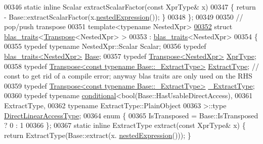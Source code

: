 \begin{DoxyCode}
00346   \textcolor{keyword}{static} \textcolor{keyword}{inline} Scalar extractScalarFactor(\textcolor{keyword}{const} XprType& x)
00347   \{ \textcolor{keywordflow}{return} - Base::extractScalarFactor(x.\hyperlink{group___core___module_a25d4402be360cf0b8ff867863da46c7d}{nestedExpression}()); \}
00348 \};
00349 
00350 \textcolor{comment}{// pop/push transpose}
00351 \textcolor{keyword}{template}<\textcolor{keyword}{typename} NestedXpr>
\hyperlink{struct_eigen_1_1internal_1_1blas__traits_3_01_transpose_3_01_nested_xpr_01_4_01_4}{00352} \textcolor{keyword}{struct }\hyperlink{struct_eigen_1_1internal_1_1blas__traits}{blas\_traits}<\hyperlink{group___core___module_class_eigen_1_1_transpose}{Transpose}<NestedXpr> >
00353  : \hyperlink{struct_eigen_1_1internal_1_1blas__traits}{blas\_traits}<NestedXpr>
00354 \{
00355   \textcolor{keyword}{typedef} \textcolor{keyword}{typename} NestedXpr::Scalar Scalar;
00356   \textcolor{keyword}{typedef} \hyperlink{struct_eigen_1_1internal_1_1blas__traits}{blas\_traits<NestedXpr>} \hyperlink{struct_eigen_1_1internal_1_1blas__traits}{Base};
00357   \textcolor{keyword}{typedef} \hyperlink{group___core___module_class_eigen_1_1_transpose}{Transpose<NestedXpr>} \hyperlink{group___core___module_class_eigen_1_1_transpose}{XprType};
00358   \textcolor{keyword}{typedef} \hyperlink{group___core___module_class_eigen_1_1_transpose}{Transpose<const typename Base::\_ExtractType>}  
      \hyperlink{group___core___module_class_eigen_1_1_transpose}{ExtractType}; \textcolor{comment}{// const to get rid of a compile error; anyway blas traits are only used on the RHS}
00359   \textcolor{keyword}{typedef} \hyperlink{group___core___module_class_eigen_1_1_transpose}{Transpose<const typename Base::\_ExtractType>} 
      \hyperlink{group___core___module_class_eigen_1_1_transpose}{\_ExtractType};
00360   \textcolor{keyword}{typedef} \textcolor{keyword}{typename} \hyperlink{struct_eigen_1_1internal_1_1conditional}{conditional}<bool(Base::HasUsableDirectAccess),
00361     ExtractType,
00362     \textcolor{keyword}{typename} ExtractType::PlainObject
00363     >::type \hyperlink{class_eigen_1_1internal_1_1_tensor_lazy_evaluator_writable}{DirectLinearAccessType};
00364   \textcolor{keyword}{enum} \{
00365     IsTransposed = Base::IsTransposed ? 0 : 1
00366   \};
00367   \textcolor{keyword}{static} \textcolor{keyword}{inline} ExtractType extract(\textcolor{keyword}{const} XprType& x) \{ \textcolor{keywordflow}{return} ExtractType(Base::extract(x.
      \hyperlink{group___core___module_a72aefbf67f5e3caf62a99f73409b4a63}{nestedExpression}())); \}

\end{DoxyCode}
